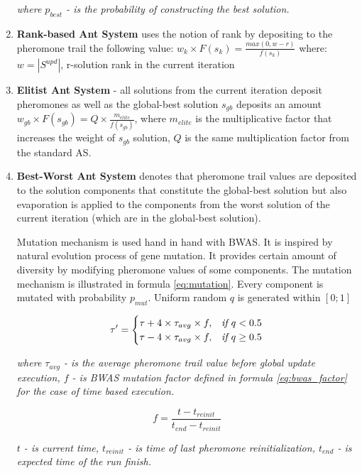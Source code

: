 \documentclass[11pt,a4paper,oneside]{book}
\begin{document}
\begin{enumerate}
\textit{where $p_{best}$ - is the probability of constructing the best solution.}

\item {\textbf{Rank-based Ant System} uses the notion of rank by depositing to the pheromone trail the following value:
$w_k \times F(s_k) = \frac{max(0,w-r)}{f(s_k)}$
where: $w=|S^{upd}|$, r-solution rank in the current iteration
}

\item {\textbf{Elitist Ant System} - all solutions from the current iteration deposit pheromones as well as the global-best solution $s_{gb}$ deposits an amount $w_{gb} \times F(s_{gb}) = Q \times \frac{m_{elite}}{f(s_{gb})}$, where $m_{elite}$ is the multiplicative factor that increases the weight of $s_{gb}$ solution, $Q$ is the same multiplication factor from the standard AS.}

\item \textbf{Best-Worst Ant System} denotes that pheromone trail values are deposited to the solution components that constitute the global-best solution but also evaporation is applied to the components from the worst solution of the current iteration (which are in the global-best solution).

Mutation mechanism is used hand in hand with BWAS. It is inspired by natural evolution process of gene mutation. It provides certain amount of diversity by modifying pheromone values of some components. The mutation mechanism is illustrated in formula \eqref{eq:mutation}. Every component is mutated with probability $p_{mut}$. Uniform random $q$ is generated within $[0;1]$

\begin{equation}
\tau' = \begin{cases}
\tau + 4 \times \tau_{avg} \times f, & \textit{if } q < 0.5 \\
\tau - 4 \times \tau_{avg} \times f, & \textit{if } q \ge 0.5
\end{cases} \\
\label{eq:mutation}
\end{equation}

\textit{where $\tau_{avg}$ - is the average pheromone trail value before global update execution, $f$ - is BWAS mutation factor defined in formula \eqref{eq:bwas_factor} for the case of time based execution.}

\begin{equation}
f = \frac{t - t_{reinit}}{t_{end} - t_{reinit}}
\label{eq:bwas_factor}
\end{equation}

\textit{$t$ - is current time, $t_{reinit}$ - is time of last pheromone reinitialization, $t_{end}$ - is expected time of the run finish.}

\end{enumerate}
\end{document}
